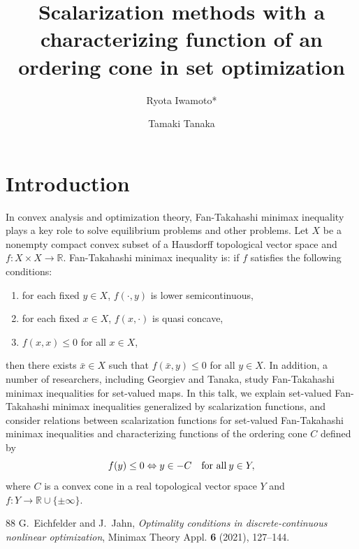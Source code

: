 \documentclass{amsart}
\title{Scalarization methods with a characterizing function 
of an ordering cone in set optimization}
\author{Ryota Iwamoto*}
\author{Tamaki Tanaka}
\begin{document}
\maketitle

\section{Introduction}
In convex analysis and optimization theory,
Fan-Takahashi minimax inequality plays a key role to solve equilibrium problems and
other problems. Let $X$ be a nonempty compact convex subset of a Hausdorff topological vector space and $f \colon X \times X \to \mathbb{R}$.
Fan-Takahashi minimax inequality is: if $f$ satisfies
the following conditions:
\begin{enumerate}[label=(\alph*)]
  \item for each fixed $y \in X$, $f(\cdot,y)$ is lower semicontinuous,
  \item for each fixed $x \in X$, $f(x,\cdot)$ is quasi concave,
  \item $f(x,x) \leq 0$ for all $x \in X$,
\end{enumerate}
then there exists $\bar{x} \in X$ such that $f(\bar{x},y) \leq 0$ for all $y \in X$. 
In addition, a number of researchers, including Georgiev and Tanaka, 
study Fan-Takahashi minimax inequalities for set-valued maps. In this talk,
we explain set-valued Fan-Takahashi minimax inequalities generalized by scalarization functions,
and consider relations between scalarization functions for set-valued Fan-Takahashi minimax inequalities 
and characterizing functions of the ordering cone $C$ \cite{EJ2021} defined by
\begin{equation}
  f(y) \leq 0 \Leftrightarrow y \in -C \quad \text{for all}\: y \in Y, \notag
\end{equation}
where $C$ is a convex cone in a real topological vector space $Y$ 
and $f: Y \to \mathbb{R} \cup \{\pm \infty\}$.

\begin{thebibliography}{88}
	G.\ Eichfelder and J.\ Jahn,
	{\em Optimality conditions in discrete-continuous nonlinear optimization}, 
	Minimax Theory Appl.
	{\bf 6} (2021), 127--144.
\end{thebibliography}
\end{document}

